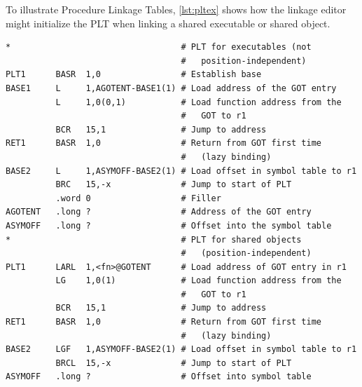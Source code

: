 \documentclass[USenglish,fontsize=11pt,twoside,%
  toc=bib,toc=idx,toc=graduated,numbers=noendperiod,
  bookmarks=true,
  bookmarksnumbered=true,
  bookmarksopen=true,
  bookmarksopenlevel=1,
  breaklinks=true,
  colorlinks=true,
  linkcolor=black,
  pdfpagelayout={TwoPageRight},
  pdfusetitle=true
]{scrreprt}
\begin{document}
To illustrate Procedure Linkage Tables, \cref{lst:pltex} shows how
the linkage editor might initialize the PLT when linking a shared
executable or shared object.

%
%
%
%

\ifzseries
\begin{lstlisting}[style=float,language=simpleasm,
  caption=Procedure Linkage Table example,label=lst:pltex]
*                                  # PLT for executables (not
                                   #   position-independent)
PLT1      BASR  1,0                # Establish base
BASE1     L     1,AGOTENT-BASE1(1) # Load address of the GOT entry
          L     1,0(0,1)           # Load function address from the
                                   #   GOT to r1
          BCR   15,1               # Jump to address
RET1      BASR  1,0                # Return from GOT first time
                                   #   (lazy binding)
BASE2     L     1,ASYMOFF-BASE2(1) # Load offset in symbol table to r1
          BRC   15,-x              # Jump to start of PLT
          .word 0                  # Filler
AGOTENT   .long ?                  # Address of the GOT entry
ASYMOFF   .long ?                  # Offset into the symbol table
*                                  # PLT for shared objects
                                   #   (position-independent)
PLT1      LARL  1,<fn>@GOTENT      # Load address of GOT entry in r1
          LG    1,0(1)             # Load function address from the
                                   #   GOT to r1
          BCR   15,1               # Jump to address
RET1      BASR  1,0                # Return from GOT first time
                                   #   (lazy binding)
BASE2     LGF   1,ASYMOFF-BASE2(1) # Load offset in symbol table to r1
          BRCL  15,-x              # Jump to start of PLT
ASYMOFF   .long ?                  # Offset into symbol table
\end{lstlisting}
\else
\end{document}
